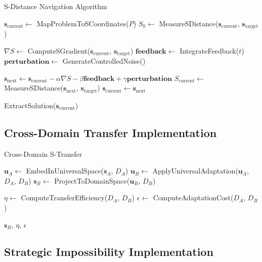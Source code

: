 \documentclass[11pt]{article}
\begin{document}
\begin{algorithm}
\caption{S-Distance Navigation Algorithm}
\begin{algorithmic}[1]
    \State $\mathbf{s}_{\text{current}} \gets$ MapProblemToSCoordinates($P$)
    \State $S_0 \gets$ MeasureSDistance($\mathbf{s}_{\text{current}}$, $\mathbf{s}_{\text{target}}$)
    
        \State $\nabla S \gets$ ComputeSGradient($\mathbf{s}_{\text{current}}$, $\mathbf{s}_{\text{target}}$)
        \State $\mathbf{feedback} \gets$ IntegrateFeedback($t$)
        \State $\mathbf{perturbation} \gets$ GenerateControlledNoise()
        
        \State $\mathbf{s}_{\text{next}} \gets \mathbf{s}_{\text{current}} - \alpha \nabla S - \beta \mathbf{feedback} + \gamma \mathbf{perturbation}$
        \State $S_{\text{current}} \gets$ MeasureSDistance($\mathbf{s}_{\text{next}}$, $\mathbf{s}_{\text{target}}$)
        \State $\mathbf{s}_{\text{current}} \gets \mathbf{s}_{\text{next}}$
    \EndWhile
    
    \State \Return ExtractSolution($\mathbf{s}_{\text{current}}$)
\EndProcedure
\end{algorithmic}
\end{algorithm}

\subsection{Cross-Domain Transfer Implementation}

\begin{algorithm}
\caption{Cross-Domain S-Transfer}
\begin{algorithmic}[1]
    \State $\mathbf{u}_A \gets$ EmbedInUniversalSpace($\mathbf{s}_A$, $D_A$)
    \State $\mathbf{u}_B \gets$ ApplyUniversalAdaptation($\mathbf{u}_A$, $D_A$, $D_B$)
    \State $\mathbf{s}_B \gets$ ProjectToDomainSpace($\mathbf{u}_B$, $D_B$)
    
    \State $\eta \gets$ ComputeTransferEfficiency($D_A$, $D_B$)
    \State $\epsilon \gets$ ComputeAdaptationCost($D_A$, $D_B$)
    
    \State \Return $\mathbf{s}_B$, $\eta$, $\epsilon$
\EndProcedure
\end{algorithmic}
\end{algorithm}

\subsection{Strategic Impossibility Implementation}
\end{document}
